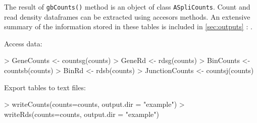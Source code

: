 \documentclass{article}
\newcommand{\secref}[1]{\ref{#1} : \nameref{#1}}
\begin{document}
The result of \texttt{gbCounts()} method is an object of class 
\texttt{ASpliCounts}\label{sec:countsContents}. Count and read density dataframes can be extracted using accesors methods. An extensive summary of the information stored in these tables is included in \secref{sec:outputs}.

Access data:

\begin{Schunk}
\begin{Sinput}
> GeneCounts <- countsg(counts)
> GeneRd <- rdsg(counts)
> BinCounts <- countsb(counts)
> BinRd <- rdsb(counts)
> JunctionCounts <- countsj(counts)
\end{Sinput}
\end{Schunk}

Export tables to text files:

\begin{Schunk}
\begin{Sinput}
> writeCounts(counts=counts, output.dir = "example")
> writeRds(counts=counts, output.dir = "example")
\end{Sinput}
\end{Schunk}
\end{document}
